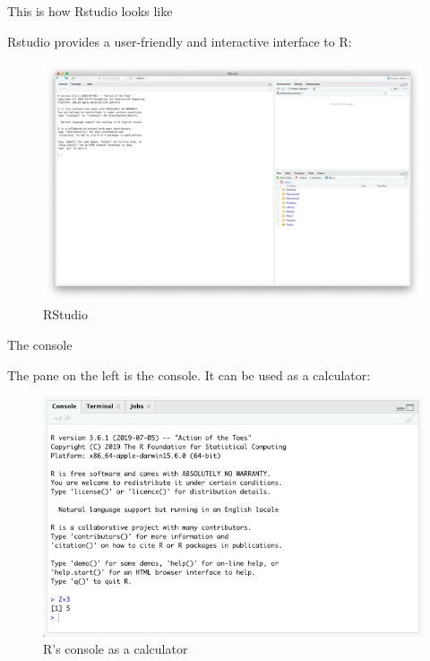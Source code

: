 \documentclass[ignorenonframetext,]{beamer}
\begin{document}
\begin{frame}{This is how Rstudio looks like}
\protect\hypertarget{this-is-how-rstudio-looks-like}{}

Rstudio provides a user-friendly and interactive interface to R:

\begin{figure}[H]
\includegraphics[scale = 0.15]{figures/Screenshot_mac}
\caption{RStudio}
\end{figure}

\end{frame}

\begin{frame}{The console}
\protect\hypertarget{the-console}{}

The pane on the left is the console. It can be used as a calculator:

\begin{figure}[H]
\includegraphics[scale = 0.35]{figures/calc}
\caption{R's console as a calculator}
\end{figure}

\end{frame}
\end{document}
